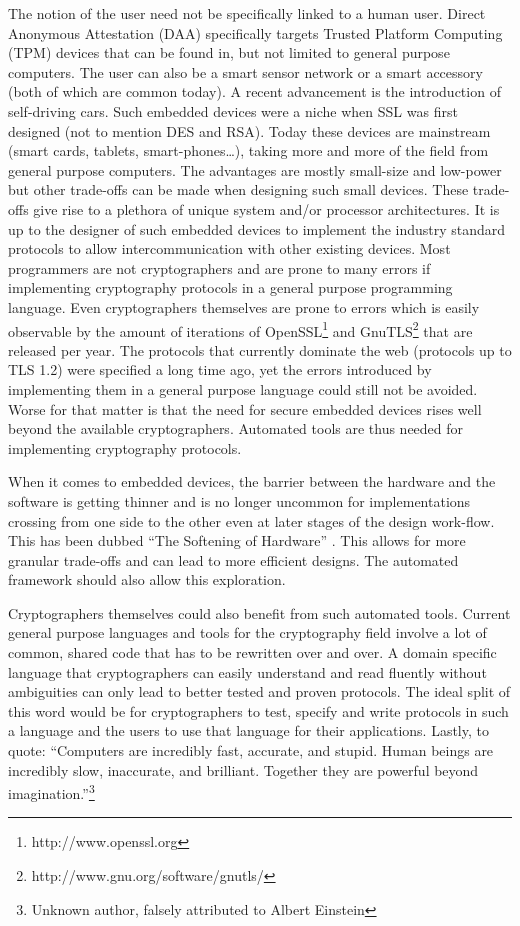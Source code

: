 The notion of the user need not be specifically linked to a human
user. Direct Anonymous Attestation (DAA) specifically targets Trusted
Platform Computing (TPM) devices that can be found in, but not limited
to general purpose computers. The user can also be a smart sensor
network or a smart accessory (both of which are common today). A
recent advancement is the introduction of self-driving cars. Such
embedded devices were a niche when SSL was first designed (not to
mention DES and RSA). Today these devices are mainstream (smart cards,
tablets, smart-phones\ldots), taking more and more of the field from
general purpose computers. The advantages are mostly small-size and
low-power but other trade-offs can be made when designing such small
devices. These trade-offs give rise to a plethora of unique system
and/or processor architectures. It is up to the designer of such
embedded devices to implement the industry standard protocols to allow
intercommunication with other existing devices. Most programmers are
not cryptographers and are prone to many errors if implementing
cryptography protocols in a general purpose programming language.
Even cryptographers themselves are prone to errors which is easily
observable by the amount of iterations of
OpenSSL\footnote{http://www.openssl.org} and
GnuTLS\footnote{http://www.gnu.org/software/gnutls/} that are released per year. The
protocols that currently dominate the web (protocols up to TLS 1.2)
were specified a long time ago, yet the errors introduced by
implementing them in a general purpose language could still not be
avoided. Worse for that matter is that the need for secure embedded
devices rises well beyond the available cryptographers. Automated
tools are thus needed for implementing cryptography protocols.

When it comes to embedded devices, the barrier between the hardware
and the software is getting thinner and is no longer uncommon for
implementations crossing from one side to the other even at later
stages of the design work-flow. This has been dubbed ``The Softening
of Hardware'' \cite{softeninghw}. This allows for more granular
trade-offs and can lead to more efficient designs. The automated
framework should also allow this exploration.

Cryptographers themselves could also benefit from such automated
tools.  Current general purpose languages and tools for the
cryptography field involve a lot of common, shared code that has to be
rewritten over and over. A domain specific language that
cryptographers can easily understand and read fluently without
ambiguities can only lead to better tested and proven protocols. The
ideal split of this word would be for cryptographers to test, specify
and write protocols in such a language and the users to use that
language for their applications. Lastly, to quote: ``Computers are
incredibly fast, accurate, and stupid. Human beings are incredibly
slow, inaccurate, and brilliant. Together they are powerful beyond
imagination.''\footnote{Unknown author, falsely attributed to Albert
  Einstein}

